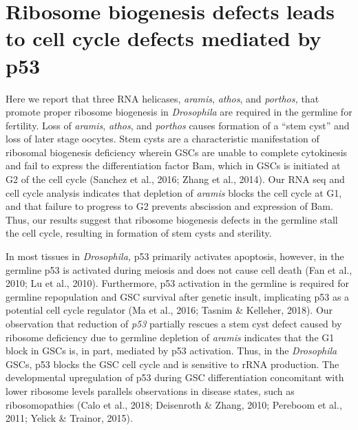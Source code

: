 \documentclass[12pt,twoside]{reedthesis}
\begin{document}
\hypertarget{ribosome-biogenesis-defects-leads-to-cell-cycle-defects-mediated-by-p53}{%
\section{Ribosome biogenesis defects leads to cell cycle defects mediated by p53}\label{ribosome-biogenesis-defects-leads-to-cell-cycle-defects-mediated-by-p53}}

Here we report that three RNA helicases, \emph{aramis}, \emph{athos}, and
\emph{porthos,} that promote proper ribosome biogenesis in \emph{Drosophila} are
required in the germline for fertility. Loss of \emph{aramis}, \emph{athos}, and
\emph{porthos} causes formation of a ``stem cyst'' and loss of later stage
oocytes. Stem cysts are a characteristic manifestation of ribosomal
biogenesis deficiency wherein GSCs are unable to complete cytokinesis
and fail to express the differentiation factor Bam, which in GSCs is
initiated at G2 of the cell cycle (Sanchez et al., 2016; Zhang et al., 2014). Our
RNA seq and cell cycle analysis indicates that depletion of \emph{aramis}
blocks the cell cycle at G1, and that failure to progress to G2 prevents
abscission and expression of Bam. Thus, our results suggest that
ribosome biogenesis defects in the germline stall the cell cycle,
resulting in formation of stem cysts and sterility.

In most tissues in \emph{Drosophila,} p53 primarily activates apoptosis,
however, in the germline p53 is activated during meiosis and does not
cause cell death (Fan et al., 2010; Lu et al., 2010). Furthermore, p53 activation in
the germline is required for germline repopulation and GSC survival
after genetic insult, implicating p53 as a potential cell cycle
regulator (Ma et al., 2016; Tasnim \& Kelleher, 2018). Our
observation that reduction of \emph{p53} partially rescues a stem cyst defect
caused by ribosome deficiency due to germline depletion of \emph{aramis}
indicates that the G1 block in GSCs is, in part, mediated by p53
activation. Thus, in the \emph{Drosophila} GSCs, p53 blocks the GSC cell
cycle and is sensitive to rRNA production. The developmental
upregulation of p53 during GSC differentiation concomitant with lower
ribosome levels parallels observations in disease states, such as
ribosomopathies (Calo et al., 2018; Deisenroth \& Zhang, 2010; Pereboom et al., 2011; Yelick \& Trainor, 2015).
\end{document}
